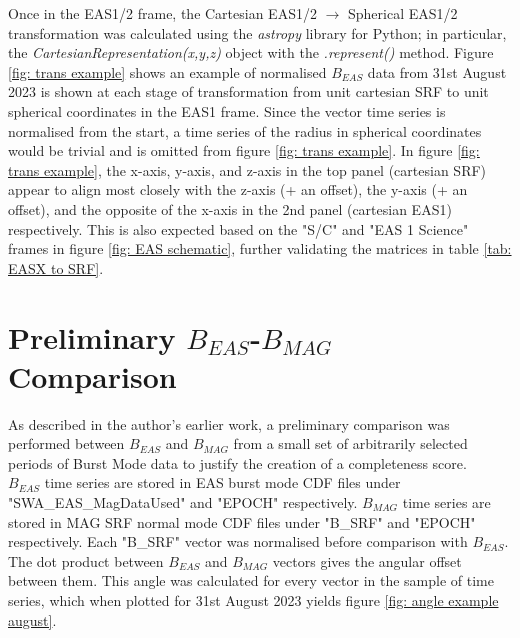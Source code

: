 Once in the EAS1/2 frame, the Cartesian EAS1/2 \(\rightarrow\) Spherical EAS1/2 transformation was calculated using the \textit{astropy} library for Python; in particular, the \textit{CartesianRepresentation(x,y,z)} object with the \textit{.represent()} method\cite{astropy2013}\cite{astropy2018}\cite{astropy2022}. Figure \ref{fig: trans example} shows an example of normalised \(B_{EAS}\) data from 31st August 2023 is shown at each stage of transformation from unit cartesian SRF to unit spherical coordinates in the EAS1 frame. Since the vector time series is normalised from the start, a time series of the radius in spherical coordinates would be trivial and is omitted from figure \ref{fig: trans example}. In figure \ref{fig: trans example}, the x-axis, y-axis, and z-axis in the top panel (cartesian SRF) appear to align most closely with the z-axis (+ an offset), the y-axis (+ an offset), and the opposite of the x-axis in the 2nd panel (cartesian EAS1) respectively. This is also expected based on the "S/C" and "EAS 1 Science" frames in figure \ref{fig: EAS schematic}, further validating the matrices in table \ref{tab: EASX to SRF}.
\\


\section{Preliminary \(B_{EAS}\)-\(B_{MAG}\) Comparison}
As described in the author's earlier work, a preliminary comparison was performed between \(B_{EAS}\) and \(B_{MAG}\) from a small set of arbitrarily selected periods of Burst Mode data to justify the creation of a completeness score\cite{dickson2024}.
\\

\(B_{EAS}\) time series are stored in EAS burst mode CDF files under "SWA\_EAS\_MagDataUsed" and "EPOCH" respectively. \(B_{MAG}\) time series are stored in MAG SRF normal mode CDF files under "B\_SRF" and "EPOCH" respectively. Each "B\_SRF" vector was normalised before comparison with \(B_{EAS}\). The dot product between \(B_{EAS}\) and \(B_{MAG}\) vectors gives the angular offset between them. This angle was calculated for every vector in the sample of time series, which when plotted for 31st August 2023 yields figure \ref{fig: angle example august}.
\\

